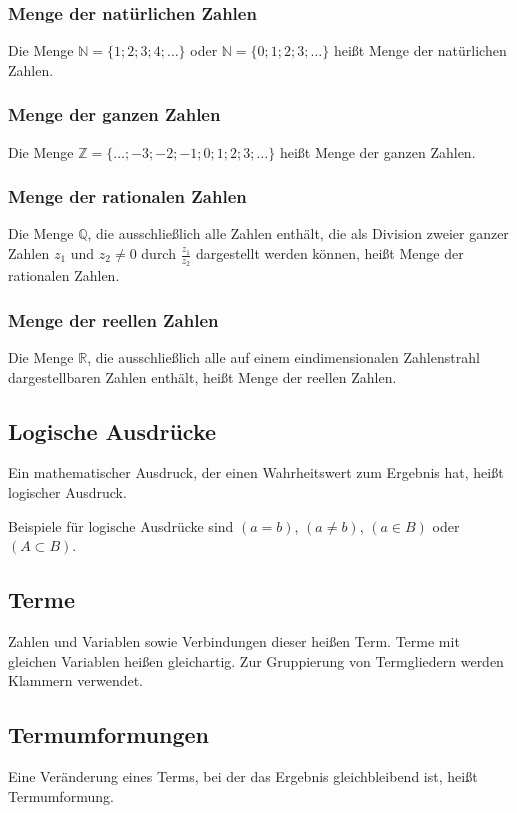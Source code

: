 \subsubsection{Menge der natürlichen Zahlen}
\begin{definition}
    Die Menge $\mathbb{N} = \{1;2;3;4;\dots\}$ oder $\mathbb{N} = \{0;1;2;3;\dots\}$ heißt Menge der natürlichen Zahlen.
\end{definition}

\subsubsection{Menge der ganzen Zahlen}
\begin{definition}
    Die Menge $\mathbb{Z} = \{\dots;-3;-2;-1;0;1;2;3;\dots\}$ heißt Menge der ganzen Zahlen. 
\end{definition}

\subsubsection{Menge der rationalen Zahlen}
\begin{definition}
    Die Menge $\mathbb{Q}$, die ausschließlich alle Zahlen enthält, die als Division zweier ganzer Zahlen $z_1$ und $z_2 \neq 0$ durch $\displaystyle\frac{z_1}{z_2}$ dargestellt werden können, heißt Menge der rationalen Zahlen.
\end{definition}

\subsubsection{Menge der reellen Zahlen}
\begin{definition}
    Die Menge $\mathbb{R}$, die ausschließlich alle auf einem eindimensionalen Zahlenstrahl dargestellbaren Zahlen enthält, heißt Menge der reellen Zahlen.
\end{definition}

\subsection{Logische Ausdrücke}
\begin{definition}
    Ein mathematischer Ausdruck, der einen Wahrheitswert zum Ergebnis hat, heißt logischer Ausdruck.
\end{definition}
Beispiele für logische Ausdrücke sind $(a = b)$, $(a \neq b)$, $(a \in B)$ oder $(A \subset B)$.

\subsection{Terme}
\begin{definition}
    Zahlen und Variablen sowie Verbindungen dieser heißen Term. Terme mit gleichen Variablen heißen gleichartig. Zur Gruppierung von Termgliedern werden Klammern verwendet.
\end{definition}

\subsection{Termumformungen}
\begin{definition}
    Eine Veränderung eines Terms, bei der das Ergebnis gleichbleibend ist, heißt Termumformung.
\end{definition}


